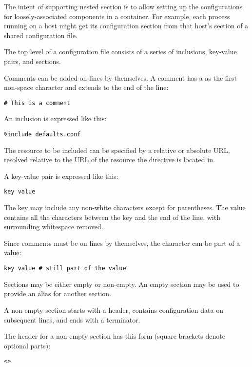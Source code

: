 \documentclass{howto}
\begin{document}
The intent of supporting nested section is to allow setting up the
configurations for loosely-associated components in a container.  For
example, each process running on a host might get its configuration
section from that host's section of a shared configuration file.

The top level of a configuration file consists of a series of
inclusions, key-value pairs, and sections.

Comments can be added on lines by themselves.  A comment has a
\character{\#} as the first non-space character and extends to the end
of the line:

\begin{verbatim}
# This is a comment
\end{verbatim}

An inclusion is expressed like this:

\begin{verbatim}
%include defaults.conf
\end{verbatim}

The resource to be included can be specified by a relative or absolute
URL, resolved relative to the URL of the resource the
 directive is located in.


A key-value pair is expressed like this:

\begin{verbatim}
key value
\end{verbatim}

The key may include any non-white characters except for parentheses.
The value contains all the characters between the key and the end of
the line, with surrounding whitespace removed.

Since comments must be on lines by themselves, the \character{\#}
character can be part of a value:

\begin{verbatim}
key value # still part of the value
\end{verbatim}

Sections may be either empty or non-empty.  An empty section may be
used to provide an alias for another section.

A non-empty section starts with a header, contains configuration
data on subsequent lines, and ends with a terminator.

The header for a non-empty section has this form (square brackets
denote optional parts):

\begin{alltt}
<  >
\end{alltt}
\end{document}
